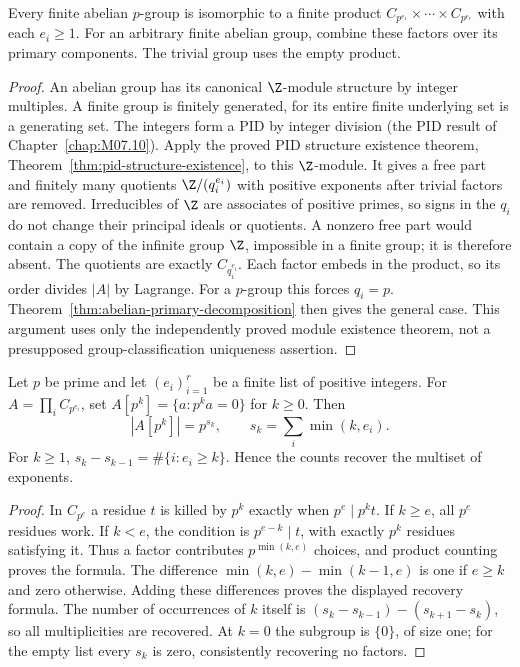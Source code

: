 \begin{theorem}\label{thm:abelian-elementary-existence}
Every finite abelian $p$-group is isomorphic to a finite product $C_{p^{e_1}}\times\cdots\times C_{p^{e_r}}$ with each $e_i\geq1$. For an arbitrary finite abelian group, combine these factors over its primary components. The trivial group uses the empty product.
\end{theorem}
\begin{proof}
An abelian group has its canonical $\Z$-module structure by integer multiples. A finite group is finitely generated, for its entire finite underlying set is a generating set. The integers form a PID by integer division (the PID result of Chapter~\ref{chap:M07.10}). Apply the proved PID structure existence theorem, Theorem~\ref{thm:pid-structure-existence}, to this $\Z$-module. It gives a free part and finitely many quotients $\Z/(q_i^{e_i})$ with positive exponents after trivial factors are removed. Irreducibles of $\Z$ are associates of positive primes, so signs in the $q_i$ do not change their principal ideals or quotients. A nonzero free part would contain a copy of the infinite group $\Z$, impossible in a finite group; it is therefore absent. The quotients are exactly $C_{q_i^{e_i}}$. Each factor embeds in the product, so its order divides $|A|$ by Lagrange. For a $p$-group this forces $q_i=p$. Theorem~\ref{thm:abelian-primary-decomposition} then gives the general case. This argument uses only the independently proved module existence theorem, not a presupposed group-classification uniqueness assertion.
\end{proof}

\begin{proposition}\label{prop:primary-torsion-counts}
Let $p$ be prime and let $(e_i)_{i=1}^r$ be a finite list of positive integers. For $A=\prod_iC_{p^{e_i}}$, set $A[p^k]=\{a:p^ka=0\}$ for $k\geq0$. Then
\[
 |A[p^k]|=p^{s_k},\qquad s_k=\sum_i\min(k,e_i).
\]
For $k\geq1$, $s_k-s_{k-1}=\#\{i:e_i\geq k\}$. Hence the counts recover the multiset of exponents.
\end{proposition}
\begin{proof}
In $C_{p^e}$ a residue $t$ is killed by $p^k$ exactly when $p^e\mid p^kt$. If $k\geq e$, all $p^e$ residues work. If $k<e$, the condition is $p^{e-k}\mid t$, with exactly $p^k$ residues satisfying it. Thus a factor contributes $p^{\min(k,e)}$ choices, and product counting proves the formula. The difference $\min(k,e)-\min(k-1,e)$ is one if $e\geq k$ and zero otherwise. Adding these differences proves the displayed recovery formula. The number of occurrences of $k$ itself is
$(s_k-s_{k-1})-(s_{k+1}-s_k)$, so all multiplicities are recovered. At $k=0$ the subgroup is $\{0\}$, of size one; for the empty list every $s_k$ is zero, consistently recovering no factors.
\end{proof}

